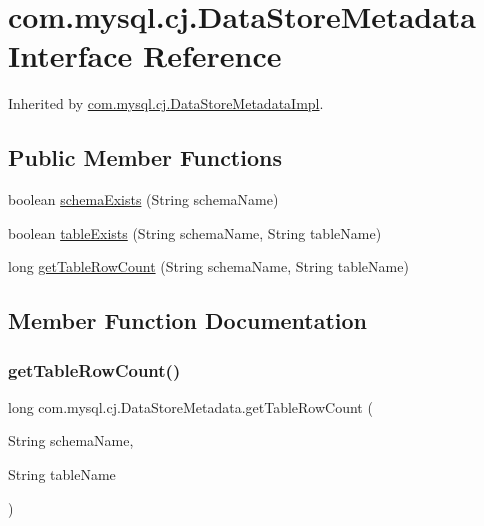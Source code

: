 \hypertarget{interfacecom_1_1mysql_1_1cj_1_1_data_store_metadata}{}\section{com.\+mysql.\+cj.\+Data\+Store\+Metadata Interface Reference}
\label{interfacecom_1_1mysql_1_1cj_1_1_data_store_metadata}


Inherited by \mbox{\hyperlink{classcom_1_1mysql_1_1cj_1_1_data_store_metadata_impl}{com.\+mysql.\+cj.\+Data\+Store\+Metadata\+Impl}}.

\subsection*{Public Member Functions}
\begin{DoxyCompactItemize}
\item 
boolean \mbox{\hyperlink{interfacecom_1_1mysql_1_1cj_1_1_data_store_metadata_a84e051d687ac64b12284d1108299ddd2}{schema\+Exists}} (String schema\+Name)
\item 
boolean \mbox{\hyperlink{interfacecom_1_1mysql_1_1cj_1_1_data_store_metadata_aa5f40f6700b0a10a53ef81b8481b34be}{table\+Exists}} (String schema\+Name, String table\+Name)
\item 
long \mbox{\hyperlink{interfacecom_1_1mysql_1_1cj_1_1_data_store_metadata_a32914475145214a820abf505afcaa2fd}{get\+Table\+Row\+Count}} (String schema\+Name, String table\+Name)
\end{DoxyCompactItemize}


\subsection{Member Function Documentation}
\mbox{\label{interfacecom_1_1mysql_1_1cj_1_1_data_store_metadata_a32914475145214a820abf505afcaa2fd}} 
\subsubsection{\texorpdfstring{get\+Table\+Row\+Count()}{getTableRowCount()}}
{\footnotesize\ttfamily long com.\+mysql.\+cj.\+Data\+Store\+Metadata.\+get\+Table\+Row\+Count (\begin{DoxyParamCaption}\item[{String}]{schema\+Name,  }\item[{String}]{table\+Name }\end{DoxyParamCaption})}



